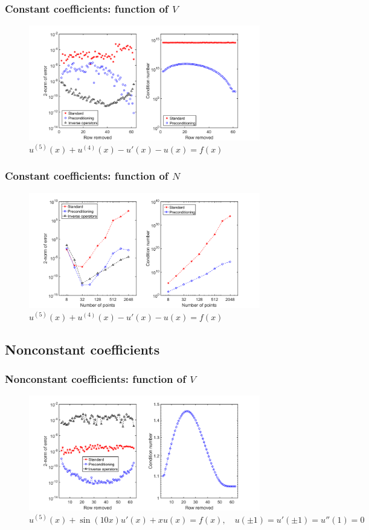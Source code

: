 \documentclass{beamer}
\begin{document}
\begin{frame}
\frametitle{Constant coefficients: function of $V$}
\begin{figure}
\includegraphics[width=0.9\textwidth]{example_5thCC_V.png}
\caption{$u^{(5)}(x) + u^{(4)}(x) - u'(x) - u(x) = f(x)$}
\end{figure}
\end{frame}

\begin{frame}
\frametitle{Constant coefficients: function of $N$}
\begin{figure}
\includegraphics[width=0.9\textwidth]{example_5thCC_N.png}
\caption{ $u^{(5)}(x) + u^{(4)}(x) - u'(x) - u(x) = f(x)$}
\end{figure}
\end{frame}

\subsection{Nonconstant coefficients}

\begin{frame}
\frametitle{Nonconstant coefficients: function of $V$}
\begin{figure}
\includegraphics[width=0.9\textwidth]{example_Wang5th_V64.png}
\caption{ $u^{(5)}(x) + \sin(10x) u'(x) + x u(x) = f(x), \quad u(\pm 1) = u'(\pm 1) = u''(1) = 0$}
\end{figure}
\end{frame}
\end{document}
